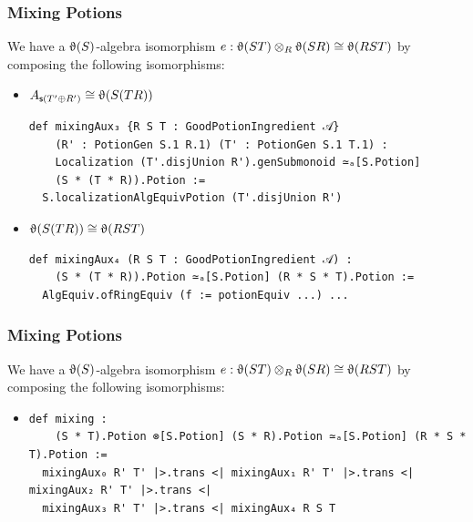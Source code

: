 \documentclass[9pt]{beamer}
\begin{document}
\begin{frame}[fragile]
\frametitle{Mixing Potions}
  We have a $\operatorname{\upvartheta}(S)$-algebra isomorphism $e: \operatorname{\upvartheta}(ST) \otimes_R \operatorname{\upvartheta}(SR) \cong \operatorname{\upvartheta}(RST)$ by 
  composing the following isomorphisms:
\begin{itemize}
  \item $A_{\mathsf{s}(T'\oplus R')} \cong \operatorname{\upvartheta}(S(TR))$
    \begin{lstlisting}
def mixingAux₃ {R S T : GoodPotionIngredient 𝒜}
    (R' : PotionGen S.1 R.1) (T' : PotionGen S.1 T.1) :
    Localization (T'.disjUnion R').genSubmonoid ≃ₐ[S.Potion]
    (S * (T * R)).Potion :=
  S.localizationAlgEquivPotion (T'.disjUnion R')
  \end{lstlisting}

  \item $\operatorname{\upvartheta}(S(TR)) \cong \operatorname{\upvartheta}(RST)$
  \begin{lstlisting}
def mixingAux₄ (R S T : GoodPotionIngredient 𝒜) :
    (S * (T * R)).Potion ≃ₐ[S.Potion] (R * S * T).Potion :=
  AlgEquiv.ofRingEquiv (f := potionEquiv ...) ...
  \end{lstlisting}

\end{itemize}
\end{frame}


\begin{frame}[fragile]
\frametitle{Mixing Potions}
  We have a $\operatorname{\upvartheta}(S)$-algebra isomorphism $e: \operatorname{\upvartheta}(ST) \otimes_R \operatorname{\upvartheta}(SR) \cong \operatorname{\upvartheta}(RST)$ by 
  composing the following isomorphisms:
\begin{itemize}
\item   \begin{lstlisting}[]
def mixing : 
    (S * T).Potion ⊗[S.Potion] (S * R).Potion ≃ₐ[S.Potion] (R * S * T).Potion :=
  mixingAux₀ R' T' |>.trans <| mixingAux₁ R' T' |>.trans <| mixingAux₂ R' T' |>.trans <|
  mixingAux₃ R' T' |>.trans <| mixingAux₄ R S T
  \end{lstlisting}
\end{itemize}
\end{frame}
\end{document}
